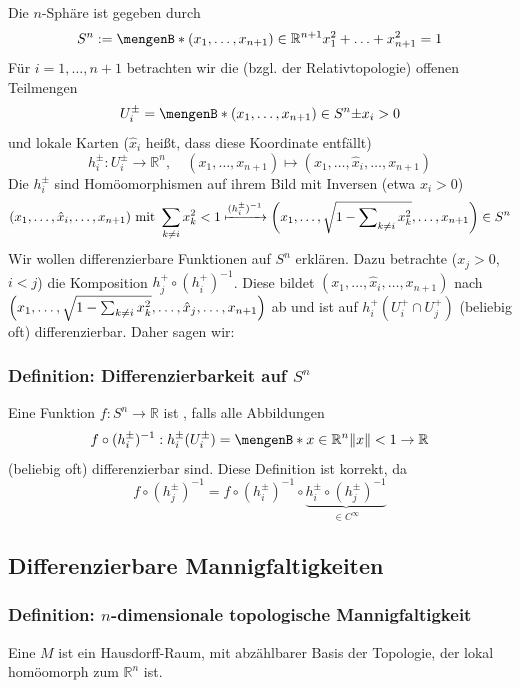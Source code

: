 Die $n$-Sphäre ist gegeben durch
\[
	S^n := \set[(x_1, \ldots , x_{n+1}) \in \mathds{R}^{n+1}]{x_1^2 + \ldots + x_{n+1}^2 = 1} 
\]
Für $i=1, \ldots , n+1$ betrachten wir die (bzgl. der Relativtopologie) offenen Teilmengen
\[
	U_i^{\pm} = \set[(x_1, \ldots , x_{n+1}) \in S^n]{\pm x_i >0} 
\]
und lokale Karten {\color{light_gray}\footnotesize($\hat x_i$ heißt, dass diese Koordinate entfällt)}
\[
	h_i^\pm : U_i^\pm \to \mathds{R}^n, \quad (x_1, \ldots , x_{n+1}) \mapsto (x_1, \ldots , \hat x_i, \ldots , x_{n+1}) \tag{weglassen}
\]
Die $h_i^\pm$ sind Homöomorphismen auf ihrem Bild mit Inversen (etwa $x_i >0$)
\[
	(x_1, \ldots , \hat x_i, \ldots , x_{n+1}) \text{ mit } \sum_{k\not= i} x_k^2< 1 \xmapsto{(h_i^\pm) ^{-1}} \enbrace*{x_1, \ldots , \sqrt{1- \sum\nolimits_{k\not=i} x_k^2 }, \ldots , x_{n+1}  } \in S^{n}  
\]
Wir wollen differenzierbare Funktionen auf $S^n$ erklären. Dazu betrachte ($x_j >0$, $i<j$) die Komposition $h_j^+ \circ (h_i^+) ^{-1}$. Diese bildet
$(x_1, \ldots , \hat x_i, \ldots , x_{n+1})$ nach $\enbrace*{x_1, \ldots , \sqrt{1 - \sum_{k\not=i}x_k^2 }, \ldots , \hat x_j, \ldots , x_{n+1}  } $ ab und ist auf
$h_i^+(U_i^+ \cap U_j^+)$ (beliebig oft) differenzierbar. Daher sagen wir:

\subsubsection{Definition: Differenzierbarkeit auf $S^n$}
Eine Funktion $f : S^n \to \mathds{R}$ ist , falls alle Abbildungen 
\[
	f \circ (h_i^\pm) ^{-1} : h_i^\pm (U_i^\pm)  = \set[x \in \mathds{R}^n]{\norm{x}< 1 } \to \mathds{R} 
\]
(beliebig oft) differenzierbar sind.
Diese Definition ist korrekt, da 
\[
	f \circ (h_j^\pm) ^{-1} = f \circ (h_i^\pm) ^{-1} \circ \underbrace{h_i^\pm \circ (h_j^\pm) ^{-1}}_{\in C^\infty}
\]

\subsection{Differenzierbare Mannigfaltigkeiten} %
\label{sub:12}
\subsubsection{Definition: $n$-dimensionale topologische Mannigfaltigkeit}
\label{ssub:121}
Eine  $M$ ist ein 
Hausdorff-Raum, mit abzählbarer Basis der Topologie, der lokal homöomorph zum $\mathds{R}^n$ ist.


